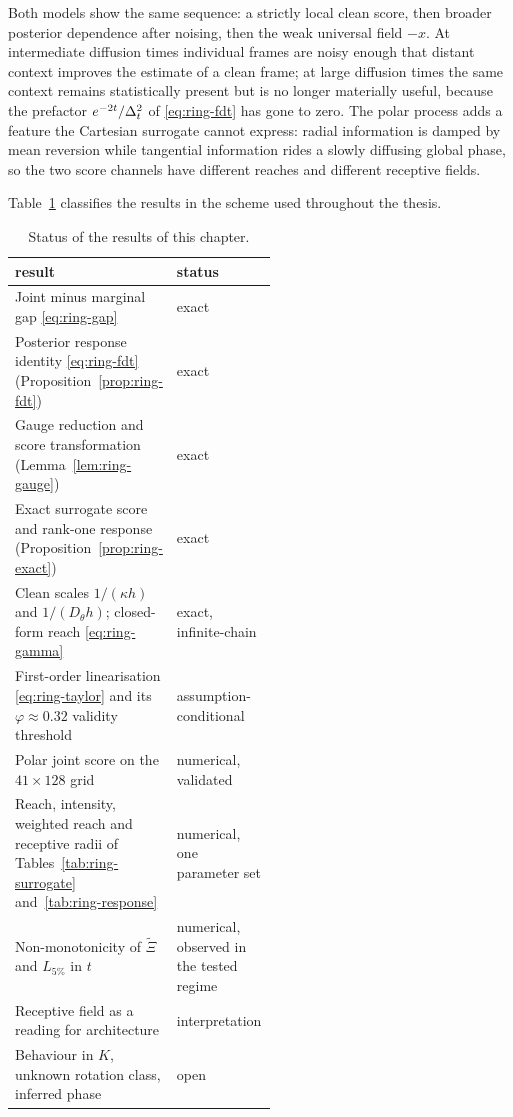 Both models show the same sequence: a strictly local clean score, then broader
posterior dependence after noising, then the weak universal field $-x$. At
intermediate diffusion times individual frames are noisy enough that distant
context improves the estimate of a clean frame; at large diffusion times the
same context remains statistically present but is no longer materially useful,
because the prefactor $e^{-2t}/\Delta_t^2$ of \eqref{eq:ring-fdt} has gone to
zero. The polar process adds a feature the Cartesian surrogate cannot express:
radial information is damped by mean reversion while tangential information
rides a slowly diffusing global phase, so the two score channels have different
reaches and different receptive fields.

Table~\ref{tab:ring-claims} classifies the results in the scheme used
throughout the thesis.

\begin{table}[t]\centering
\caption{Status of the results of this chapter.}
\label{tab:ring-claims}
\begin{tabular}{@{}p{0.52\linewidth}l@{}}
\toprule
result & status \\
\midrule
Joint minus marginal gap \eqref{eq:ring-gap} & exact \\
Posterior response identity \eqref{eq:ring-fdt}
  (Proposition~\ref{prop:ring-fdt}) & exact \\
Gauge reduction and score transformation
  (Lemma~\ref{lem:ring-gauge}) & exact \\
Exact surrogate score and rank-one response
  (Proposition~\ref{prop:ring-exact}) & exact \\
Clean scales $1/(\kappa h)$ and $1/(D_\theta h)$; closed-form reach
  \eqref{eq:ring-gamma} & exact, infinite-chain \\
First-order linearisation \eqref{eq:ring-taylor} and its
  $\varphi \approx 0.32$ validity threshold & assumption-conditional \\
Polar joint score on the $41\times128$ grid & numerical, validated \\
Reach, intensity, weighted reach and receptive radii of
  Tables~\ref{tab:ring-surrogate} and~\ref{tab:ring-response}
  & numerical, one parameter set \\
Non-monotonicity of $\widetilde\Xi$ and $L_{5\%}$ in $t$
  & numerical, observed in the tested regime \\
Receptive field as a reading for architecture & interpretation \\
Behaviour in $K$, unknown rotation class, inferred phase & open \\
\bottomrule
\end{tabular}
\end{table}

